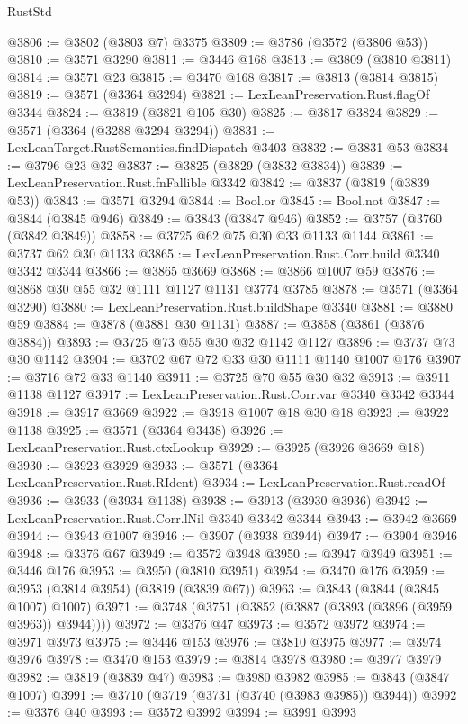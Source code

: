 \begin{lexlean}{RustStd}
\begin{coremodule}
@3806 := @3802 (@3803 @7) @3375
@3809 := @3786 (@3572 (@3806 @53))
@3810 := @3571 @3290
@3811 := @3446 @168
@3813 := @3809 (@3810 @3811)
@3814 := @3571 @23
@3815 := @3470 @168
@3817 := @3813 (@3814 @3815)
@3819 := @3571 (@3364 @3294)
@3821 := LexLeanPreservation.Rust.flagOf @3344
@3824 := @3819 (@3821 @105 @30)
@3825 := @3817 @3824
@3829 := @3571 (@3364 (@3288 @3294 @3294))
@3831 := LexLeanTarget.RustSemantics.findDispatch @3403
@3832 := @3831 @53
@3834 := @3796 @23 @32
@3837 := @3825 (@3829 (@3832 @3834))
@3839 := LexLeanPreservation.Rust.fnFallible @3342
@3842 := @3837 (@3819 (@3839 @53))
@3843 := @3571 @3294
@3844 := Bool.or
@3845 := Bool.not
@3847 := @3844 (@3845 @946)
@3849 := @3843 (@3847 @946)
@3852 := @3757 (@3760 (@3842 @3849))
@3858 := @3725 @62 @75 @30 @33 @1133 @1144
@3861 := @3737 @62 @30 @1133
@3865 := LexLeanPreservation.Rust.Corr.build @3340 @3342 @3344
@3866 := @3865 @3669
@3868 := @3866 @1007 @59
@3876 := @3868 @30 @55 @32 @1111 @1127 @1131 @3774 @3785
@3878 := @3571 (@3364 @3290)
@3880 := LexLeanPreservation.Rust.buildShape @3340
@3881 := @3880 @59
@3884 := @3878 (@3881 @30 @1131)
@3887 := @3858 (@3861 (@3876 @3884))
@3893 := @3725 @73 @55 @30 @32 @1142 @1127
@3896 := @3737 @73 @30 @1142
@3904 := @3702 @67 @72 @33 @30 @1111 @1140 @1007 @176
@3907 := @3716 @72 @33 @1140
@3911 := @3725 @70 @55 @30 @32
@3913 := @3911 @1138 @1127
@3917 := LexLeanPreservation.Rust.Corr.var @3340 @3342 @3344
@3918 := @3917 @3669
@3922 := @3918 @1007 @18 @30 @18
@3923 := @3922 @1138
@3925 := @3571 (@3364 @3438)
@3926 := LexLeanPreservation.Rust.ctxLookup
@3929 := @3925 (@3926 @3669 @18)
@3930 := @3923 @3929
@3933 := @3571 (@3364 LexLeanPreservation.Rust.RIdent)
@3934 := LexLeanPreservation.Rust.readOf
@3936 := @3933 (@3934 @1138)
@3938 := @3913 (@3930 @3936)
@3942 := LexLeanPreservation.Rust.Corr.lNil @3340 @3342 @3344
@3943 := @3942 @3669
@3944 := @3943 @1007
@3946 := @3907 (@3938 @3944)
@3947 := @3904 @3946
@3948 := @3376 @67
@3949 := @3572 @3948
@3950 := @3947 @3949
@3951 := @3446 @176
@3953 := @3950 (@3810 @3951)
@3954 := @3470 @176
@3959 := @3953 (@3814 @3954) (@3819 (@3839 @67))
@3963 := @3843 (@3844 (@3845 @1007) @1007)
@3971 := @3748 (@3751 (@3852 (@3887 (@3893 (@3896 (@3959 @3963)) @3944))))
@3972 := @3376 @47
@3973 := @3572 @3972
@3974 := @3971 @3973
@3975 := @3446 @153
@3976 := @3810 @3975
@3977 := @3974 @3976
@3978 := @3470 @153
@3979 := @3814 @3978
@3980 := @3977 @3979
@3982 := @3819 (@3839 @47)
@3983 := @3980 @3982
@3985 := @3843 (@3847 @1007)
@3991 := @3710 (@3719 (@3731 (@3740 (@3983 @3985)) @3944))
@3992 := @3376 @40
@3993 := @3572 @3992
@3994 := @3991 @3993

\end{coremodule}
\end{lexlean}
